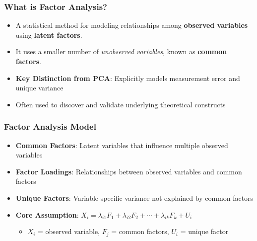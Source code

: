 \documentclass[aspectratio=169]{beamer}
\begin{document}
\begin{frame}[fragile]
    \frametitle{What is Factor Analysis?}
    \begin{itemize}
        \item A statistical method for modeling relationships among \textbf{observed variables} using \textbf{latent factors}. \pause
        \item It uses a smaller number of \textit{unobserved variables}, known as \textbf{common factors}. \pause
        \item \textbf{Key Distinction from PCA}: Explicitly models measurement error and unique variance \pause
        \item Often used to discover and validate underlying theoretical constructs
    \end{itemize}
\end{frame}

\begin{frame}[fragile]
    \frametitle{Factor Analysis Model}
    \begin{itemize}
        \item \textbf{Common Factors}: Latent variables that influence multiple observed variables \pause
        \item \textbf{Factor Loadings}: Relationships between observed variables and common factors \pause
        \item \textbf{Unique Factors}: Variable-specific variance not explained by common factors \pause
        \item \textbf{Core Assumption}: $X_i = \lambda_{i1}F_1 + \lambda_{i2}F_2 + \cdots + \lambda_{ik}F_k + U_i$
              \begin{itemize}
                  \item $X_i$ = observed variable, $F_j$ = common factors, $U_i$ = unique factor
              \end{itemize}
    \end{itemize}
\end{frame}
\end{document}
